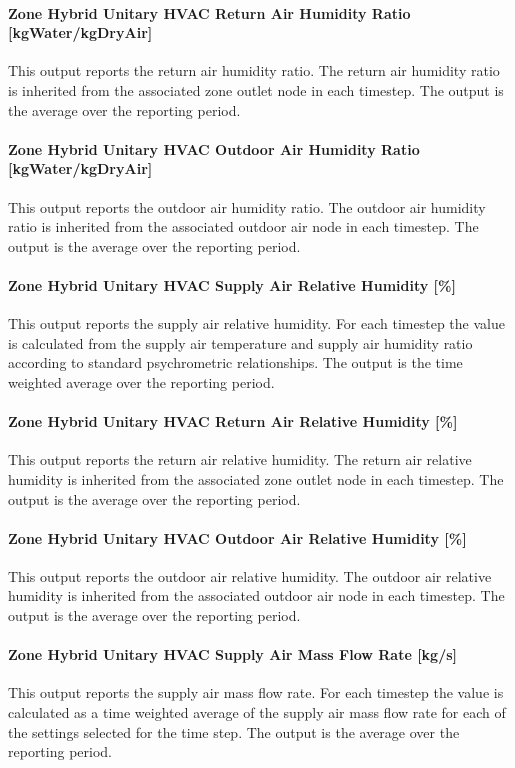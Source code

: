 \paragraph{Zone Hybrid Unitary HVAC Return Air Humidity Ratio [kgWater/kgDryAir]}
This output reports the return air humidity ratio. The return air humidity ratio is inherited from the associated zone outlet node in each timestep.  The output is the average over the reporting period.

\paragraph{Zone Hybrid Unitary HVAC Outdoor Air Humidity Ratio [kgWater/kgDryAir]}
This output reports the outdoor air humidity ratio.  The outdoor air humidity ratio is inherited from the associated outdoor air node in each timestep. The output is the average over the reporting period.

\paragraph{Zone Hybrid Unitary HVAC Supply Air Relative Humidity [\%]}
This output reports the supply air relative humidity. For each timestep the value is calculated  from the supply air temperature and supply air humidity ratio according to standard psychrometric relationships. The output is the time weighted average over the reporting period.

\paragraph{Zone Hybrid Unitary HVAC Return Air Relative Humidity [\%]}
This output reports the return air relative humidity. The return air relative humidity is inherited from the associated zone outlet node in each timestep. The output is the average over the reporting period.

\paragraph{Zone Hybrid Unitary HVAC Outdoor Air Relative Humidity [\%]}
This output reports the outdoor air relative humidity. The outdoor air relative humidity is inherited from the associated outdoor air node in each timestep. The output is the average over the reporting period.

\paragraph{Zone Hybrid Unitary HVAC Supply Air Mass Flow Rate [kg/s]}
This output reports the supply air mass flow rate. For each timestep the value is calculated as a time weighted average of the supply air mass flow rate for each of the settings selected for the time step. The output is the average over the reporting period.

